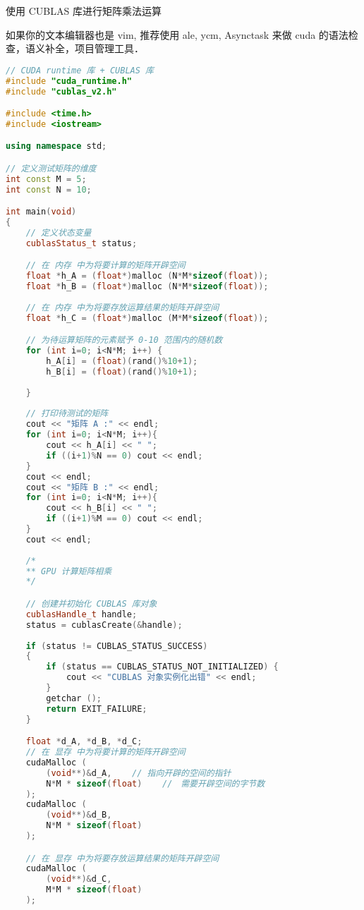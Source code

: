使用 CUBLAS 库进行矩阵乘法运算

如果你的文本编辑器也是 vim, 推荐使用 ale, ycm, Asynctask 来做 cuda 的语法检查，语义补全，项目管理工具．
\begin{lstlisting}[language=cpp]
// CUDA runtime 库 + CUBLAS 库 
#include "cuda_runtime.h"
#include "cublas_v2.h"

#include <time.h>
#include <iostream>

using namespace std;

// 定义测试矩阵的维度
int const M = 5;
int const N = 10;

int main(void) 
{   
    // 定义状态变量
    cublasStatus_t status;

    // 在 内存 中为将要计算的矩阵开辟空间
    float *h_A = (float*)malloc (N*M*sizeof(float));
    float *h_B = (float*)malloc (N*M*sizeof(float));
    
    // 在 内存 中为将要存放运算结果的矩阵开辟空间
    float *h_C = (float*)malloc (M*M*sizeof(float));

    // 为待运算矩阵的元素赋予 0-10 范围内的随机数
    for (int i=0; i<N*M; i++) {
        h_A[i] = (float)(rand()%10+1);
        h_B[i] = (float)(rand()%10+1);
    
    }
    
    // 打印待测试的矩阵
    cout << "矩阵 A :" << endl;
    for (int i=0; i<N*M; i++){
        cout << h_A[i] << " ";
        if ((i+1)%N == 0) cout << endl;
    }
    cout << endl;
    cout << "矩阵 B :" << endl;
    for (int i=0; i<N*M; i++){
        cout << h_B[i] << " ";
        if ((i+1)%M == 0) cout << endl;
    }
    cout << endl;
    
    /*
    ** GPU 计算矩阵相乘
    */

    // 创建并初始化 CUBLAS 库对象
    cublasHandle_t handle;
    status = cublasCreate(&handle);
    
    if (status != CUBLAS_STATUS_SUCCESS)
    {
        if (status == CUBLAS_STATUS_NOT_INITIALIZED) {
            cout << "CUBLAS 对象实例化出错" << endl;
        }
        getchar ();
        return EXIT_FAILURE;
    }

    float *d_A, *d_B, *d_C;
    // 在 显存 中为将要计算的矩阵开辟空间
    cudaMalloc (
        (void**)&d_A,    // 指向开辟的空间的指针
        N*M * sizeof(float)    //　需要开辟空间的字节数
    );
    cudaMalloc (
        (void**)&d_B,    
        N*M * sizeof(float)    
    );

    // 在 显存 中为将要存放运算结果的矩阵开辟空间
    cudaMalloc (
        (void**)&d_C,
        M*M * sizeof(float)    
    );


\end{lstlisting}
